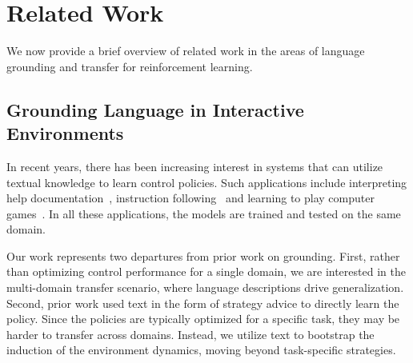 \section{Related Work}
\label{sec:related_work}
We now provide a brief overview of related work in the areas of language grounding and transfer for reinforcement learning.
%
%


\subsection{Grounding Language in Interactive Environments}
In recent years, there has been increasing interest in systems that can utilize textual knowledge to learn control policies. Such applications include interpreting help documentation~, instruction following~ and learning to play computer games~. In all these applications, the models are trained and tested on the same domain.

Our work represents two departures from prior work on grounding. First, rather than optimizing control performance for a single domain,
we are interested in the multi-domain transfer scenario, where language 
descriptions drive generalization. Second, prior work used text in the form of strategy advice to directly learn the policy. Since the policies are typically optimized for a specific task, they may be harder to transfer across domains. Instead, we utilize text to bootstrap the induction of the environment dynamics, moving beyond task-specific strategies. 



